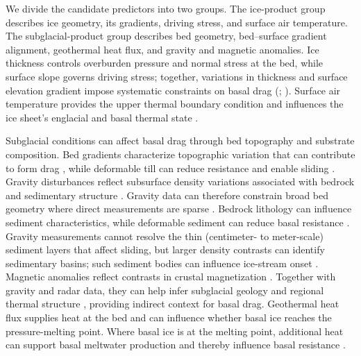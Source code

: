 \documentclass[review,jog]{igs}
\begin{document}
We divide the candidate predictors into two groups. The ice-product group describes ice geometry, its gradients, driving stress, and surface air temperature. The subglacial-product group describes bed geometry, bed--surface gradient alignment, geothermal heat flux, and gravity and magnetic anomalies. Ice thickness controls overburden pressure and normal stress at the bed, while surface slope governs driving stress; together, variations in thickness and surface elevation gradient impose systematic constraints on basal drag (\citealp{macayeal1989large}; \citealp[Sections 7.2--7.4 and 8.2]{cuffey2010physics}). Surface air temperature provides the upper thermal boundary condition and influences the ice sheet's englacial and basal thermal state \citep{meierbachtol2015thermal}. 

Subglacial conditions can affect basal drag through bed topography and substrate composition. Bed gradients characterize topographic variation that can contribute to form drag \citep{hoffman2022impact}, while deformable till can reduce resistance and enable sliding \citep{cuffey2010physics,tulaczyk2000basal,boulton2001sediment}. 
Gravity disturbances reflect subsurface density variations associated with bedrock and sedimentary structure \citep{hackney2003geodetic}. Gravity data can therefore constrain broad bed geometry where direct measurements are sparse \citep{an2017bed}. Bedrock lithology can influence sediment characteristics, while deformable sediment can reduce basal resistance \citep{crompton2016correlations,boulton2001sediment}. Gravity measurements cannot resolve the thin (centimeter- to meter-scale) sediment layers that affect sliding, but larger density contrasts can identify sedimentary basins; such sediment bodies can influence ice-stream onset \citep{bell1998influence,studinger2001subglacial,peters2006subglacial}. Magnetic anomalies reflect contrasts in crustal magnetization \citep{golynsky2018new}. Together with gravity and radar data, they can help infer subglacial geology \citep{jordan2023geological} and regional thermal structure \citep{martos2017heat,reading2022antarctic}, providing indirect context for basal drag. Geothermal heat flux supplies heat at the bed and can influence whether basal ice reaches the pressure-melting point. Where basal ice is at the melting point, additional heat can support basal meltwater production and thereby influence basal resistance \citep{dawson2022ice,kang2021evaluation}.
\end{document}

